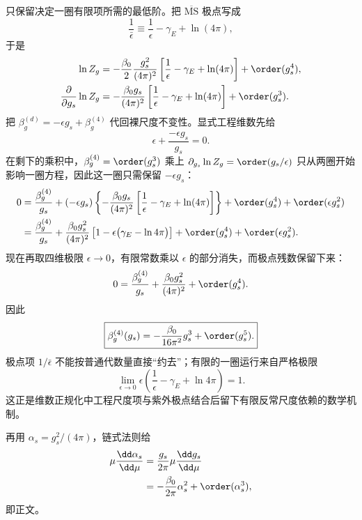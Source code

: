 \begin{derivation}[一圈强耦合演化与尺度参数]
只保留决定一圈有限项所需的最低阶。把 $\overline{\mathrm{MS}}$ 极点写成
\begin{equation*}
 \frac1{\bar\epsilon}
 \equiv
 \frac1\epsilon-\gamma_E+\ln(4\pi),
\end{equation*}
于是
\begin{align*}
\ln Z_g
&=-\frac{\beta_0}{2}
\frac{g_s^2}{(4\pi)^2}
\left[\frac1\epsilon-\gamma_E+\ln(4\pi)\right]
+\order(g_s^4),\\
\frac{\partial}{\partial g_s}\ln Z_g
&=-\frac{\beta_0 g_s}{(4\pi)^2}
\left[\frac1\epsilon-\gamma_E+\ln(4\pi)\right]
+\order(g_s^3).
\end{align*}
把 $\beta_g^{(d)}=-\epsilon g_s+\beta_g^{(4)}$ 代回裸尺度不变性。显式工程维数先给
\begin{equation*}
 \epsilon+\frac{-\epsilon g_s}{g_s}=0.
\end{equation*}
在剩下的乘积中，$\beta_g^{(4)}=\order(g_s^3)$ 乘上 $\partial_{g_s}\ln Z_g=\order(g_s/\epsilon)$ 只从两圈开始影响一圈方程，因此这一圈只需保留 $-\epsilon g_s$：
\begin{align*}
0
={}&\frac{\beta_g^{(4)}}{g_s}
+(-\epsilon g_s)
\left\{-\frac{\beta_0 g_s}{(4\pi)^2}
\left[\frac1\epsilon-\gamma_E+\ln(4\pi)\right]\right\}
+\order(g_s^4)+\order(\epsilon g_s^2)\\
={}&\frac{\beta_g^{(4)}}{g_s}
+\frac{\beta_0g_s^2}{(4\pi)^2}
\left[1-\epsilon\bigl(\gamma_E-\ln4\pi\bigr)\right]
+\order(g_s^4)+\order(\epsilon g_s^2).
\end{align*}
现在再取四维极限 $\epsilon\to0$，有限常数乘以 $\epsilon$ 的部分消失，而极点残数保留下来：
\begin{equation*}
0=\frac{\beta_g^{(4)}}{g_s}
+\frac{\beta_0g_s^2}{(4\pi)^2}
+\order(g_s^4).
\end{equation*}
因此
\begin{equation*}
\boxed{
\beta_g^{(4)}(g_s)
=-\frac{\beta_0}{16\pi^2}g_s^3
+\order(g_s^5).}
\end{equation*}
极点项 $1/\bar\epsilon$ 不能按普通代数量直接“约去”；有限的一圈运行来自严格极限
\begin{equation*}
 \lim_{\epsilon\to0}
 \epsilon\left(\frac1\epsilon-\gamma_E+\ln4\pi\right)=1.
\end{equation*}
这正是维数正规化中工程尺度项与紫外极点结合后留下有限反常尺度依赖的数学机制。

再用 \(\alpha_s=g_s^2/(4\pi)\)，链式法则给
\begin{align*}
\mu\frac{\dd\alpha_s}{\dd\mu}
&=\frac{g_s}{2\pi}
\mu\frac{\dd g_s}{\dd\mu}\\
&=-\frac{\beta_0}{2\pi}\alpha_s^2
+\order(\alpha_s^3),
\end{align*}
即正文。


\end{derivation}
